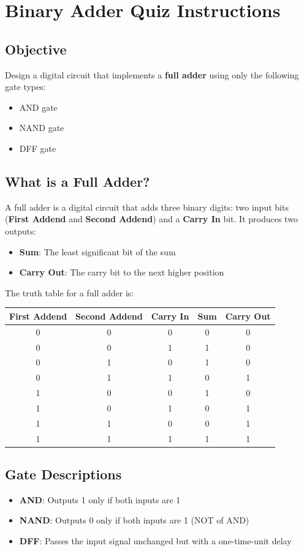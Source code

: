 \section*{Binary Adder Quiz Instructions}

\subsection*{Objective}
Design a digital circuit that implements a \textbf{full adder} using only the following gate types:
\begin{itemize}
  \item AND gate
  \item NAND gate
  \item DFF gate
\end{itemize}

\subsection*{What is a Full Adder?}
A full adder is a digital circuit that adds three binary digits: two input bits (\textbf{First Addend} and \textbf{Second Addend}) and a \textbf{Carry In} bit. It produces two outputs:
\begin{itemize}
  \item \textbf{Sum}: The least significant bit of the sum
  \item \textbf{Carry Out}: The carry bit to the next higher position
\end{itemize}

The truth table for a full adder is:
\begin{center}
\begin{tabular}{|c|c|c|c|c|}
\hline
First Addend & Second Addend & Carry In & Sum & Carry Out \\
\hline
0 & 0 & 0 & 0 & 0 \\
0 & 0 & 1 & 1 & 0 \\
0 & 1 & 0 & 1 & 0 \\
0 & 1 & 1 & 0 & 1 \\
1 & 0 & 0 & 1 & 0 \\
1 & 0 & 1 & 0 & 1 \\
1 & 1 & 0 & 0 & 1 \\
1 & 1 & 1 & 1 & 1 \\
\hline
\end{tabular}
\end{center}

\subsection*{Gate Descriptions}
\begin{itemize}
  \item \textbf{AND}: Outputs 1 only if both inputs are 1
  \item \textbf{NAND}: Outputs 0 only if both inputs are 1 (NOT of AND)
  \item \textbf{DFF}: Passes the input signal unchanged but with a one-time-unit delay
\end{itemize}

